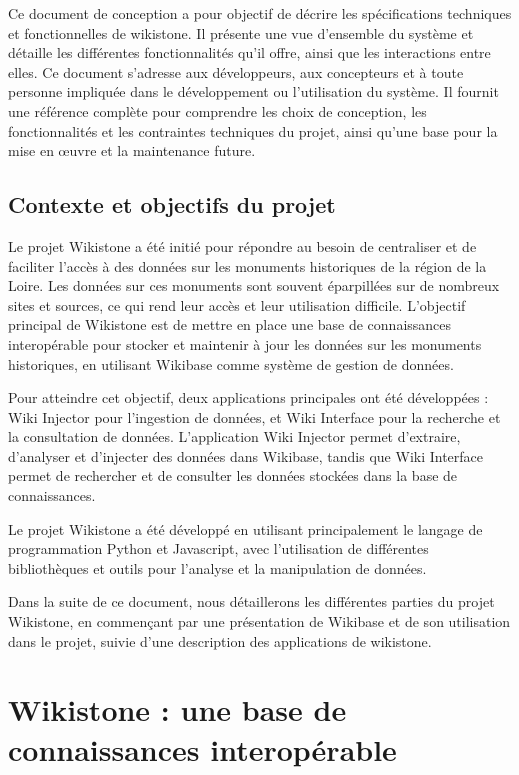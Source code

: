 \documentclass[a4paper, 12pt]{article}
\begin{document}
Ce document de conception a pour objectif de décrire les spécifications techniques et fonctionnelles de wikistone. Il présente une vue d'ensemble du système et détaille les différentes fonctionnalités qu'il offre, ainsi que les interactions entre elles. Ce document s'adresse aux développeurs, aux concepteurs et à toute personne impliquée dans le développement ou l'utilisation du système. Il fournit une référence complète pour comprendre les choix de conception, les fonctionnalités et les contraintes techniques du projet, ainsi qu'une base pour la mise en œuvre et la maintenance future.

    \subsection{Contexte et objectifs du projet}
Le projet Wikistone a été initié pour répondre au besoin de centraliser et de faciliter l'accès à des données sur les monuments historiques de la région de la Loire. Les données sur ces monuments sont souvent éparpillées sur de nombreux sites et sources, ce qui rend leur accès et leur utilisation difficile.
L'objectif principal de Wikistone est de mettre en place une base de connaissances interopérable pour stocker et maintenir à jour les données sur les monuments historiques, en utilisant Wikibase comme système de gestion de données. 

Pour atteindre cet objectif, deux applications principales ont été développées : Wiki Injector pour l'ingestion de données, et Wiki Interface pour la recherche et la consultation de données. L'application Wiki Injector permet d'extraire, d'analyser et d'injecter des données dans Wikibase, tandis que Wiki Interface permet de rechercher et de consulter les données stockées dans la base de connaissances.

Le projet Wikistone a été développé en utilisant principalement le langage de programmation Python et Javascript, avec l'utilisation de différentes bibliothèques et outils pour l'analyse et la manipulation de données. 

Dans la suite de ce document, nous détaillerons les différentes parties du projet Wikistone, en commençant par une présentation de Wikibase et de son utilisation dans le projet, suivie d'une description des applications de wikistone.

\section{Wikistone : une base de connaissances interopérable}
\end{document}
